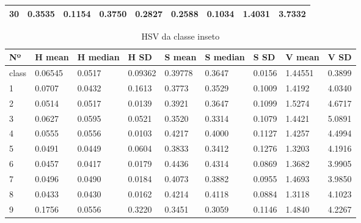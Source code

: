 \begin{anexosenv}
\begin{table}[htbp!]
\begin{tabular}{|l|l|l|l|l|l|l|l|l|}
30   & 0.3535   & 0.1154   & 0.3750               & 0.2827   & 0.2588   & 0.1034               & 1.4031  & 3.7332              \\\hline
\end{tabular}
\end{table}



\begin{table}[htbp!]
\centering
\caption{HSV da classe inseto}
\label{tab:cores_classe_inseto}
\begin{tabular}{|l|l|l|l|l|l|l|l|l|}
\hline
Nº & H mean & H median & H SD & S mean & S median & S SD & V mean & V SD \\ \hline
class & 0.06545 & 0.0517   & 0.09362              & 0.39778 & 0.3647   & 0.0156               & 1.44551 & 0.3899               \\\hline
1    & 0.0707  & 0.0432   & 0.1613               & 0.3773  & 0.3529   & 0.1009               & 1.4192  & 4.0340               \\
2    & 0.0514  & 0.0517   & 0.0139               & 0.3921  & 0.3647   & 0.1099               & 1.5274  & 4.6717               \\
3    & 0.0627  & 0.0595   & 0.0521               & 0.3520  & 0.3314   & 0.1079               & 1.4421  & 5.0891               \\
4    & 0.0555  & 0.0556   & 0.0103               & 0.4217  & 0.4000   & 0.1127               & 1.4257  & 4.4994               \\
5    & 0.0491  & 0.0449   & 0.0604               & 0.3833  & 0.3412   & 0.1276               & 1.3203  & 4.1916               \\
6    & 0.0457  & 0.0417   & 0.0179               & 0.4436  & 0.4314   & 0.0869               & 1.3682  & 3.9905               \\
7    & 0.0496  & 0.0490   & 0.0184               & 0.4073  & 0.3882   & 0.0955               & 1.4693  & 3.9850               \\
8    & 0.0433  & 0.0430   & 0.0162               & 0.4214  & 0.4118   & 0.0884               & 1.3118  & 4.1023               \\
9    & 0.1756  & 0.0556   & 0.3220               & 0.3451  & 0.3059   & 0.1146               & 1.4840  & 4.2267               \\

\end{tabular}
\end{table}
\end{anexosenv}
